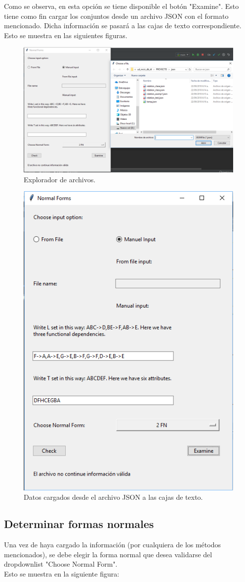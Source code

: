 \documentclass[a4paper,12pt]{article}
\begin{document}
{Como se observa, en esta opción se tiene disponible el botón "Examine". Esto tiene como fin cargar los conjuntos desde un archivo JSON con el formato mencionado. Dicha información se pasará a las cajas de texto correspondiente.
\\
Esto se muestra en las siguientes figuras.

\begin{figure}[H]
\centering
  \includegraphics[width=0.75\linewidth]{Images/examine_manual.png}
  \caption{Explorador de archivos.}
  \label{fig:neurona1}
\end{figure}

\begin{figure}[H]
\centering
  \includegraphics[width=0.3\linewidth]{Images/data_from_file.png}
  \caption{Datos cargados desde el archivo JSON a las cajas de texto.}
  \label{fig:neurona1}
\end{figure}



\subsection{Determinar formas normales}
Una vez de haya cargado la información (por cualquiera de los métodos mencionados), se debe elegir la forma normal que desea validarse del dropdownlist "Choose Normal Form".
\\
Esto se muestra en la siguiente figura:

}
\end{document}
